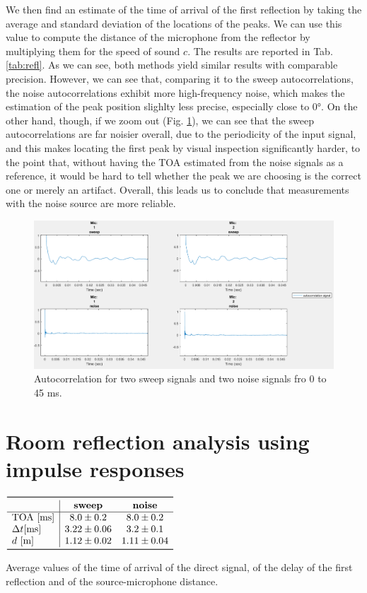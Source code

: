 \documentclass[a4paper]{article}
\begin{document}
We then find an estimate of the time of arrival of the first reflection by taking the average and standard deviation of the locations of the peaks.  We can use this value to compute the distance of the microphone from the reflector by multiplying them for the speed of sound $c$. The results are reported in Tab. \ref{tab:refl}. As we can see, both methods yield similar results with comparable precision. However, we can see that, comparing it to the  sweep autocorrelations, the noise autocorrelations exhibit more high-frequency noise, which makes the estimation of the peak position slighlty less precise, especially close to 0°. On the other hand, though, if we zoom out (Fig. \ref{fig:autocorr}), we can see that the sweep autocorrelations are far noisier overall, due to the periodicity of the input signal, and this makes locating the first peak by visual inspection significantly harder, to the point that, without having the TOA estimated from the noise signals as a reference, it would be hard to tell whether the peak we are choosing is the correct one or merely an artifact. Overall, this leads us to conclude that measurements with the noise source are more reliable.


\begin{figure}
	\centering
	\includegraphics[width=0.75\linewidth]{autocorrelation.png}
	\caption{Autocorrelation for two sweep signals and two noise signals fro 0 to 45 ms.}
	\label{fig:autocorr}
\end{figure}

\section{Room reflection analysis using impulse responses}

\begin{table}[h!]
	\centering
	$\begin{array}{l|cc}
		\toprule
		& \text{\textbf{sweep}} & \text{\textbf{noise}} \\
		\hline
		\text{TOA [ms]} & 8.0 \pm 0.2 & 8.0 \pm 0.2\\
		\Delta t \text{[ms]} & 3.22 \pm 0.06  & 3.2 \pm 0.1\\
		d \text{ [m]} & 1.12 \pm 0.02 & 1.11 \pm 0.04 \\
		\bottomrule
	\end{array}$
	\caption{Average values of the time of arrival of the direct signal, of the delay of the first reflection and of the source-microphone distance. }
	\label{tab:ir}
\end{table}
\end{document}
